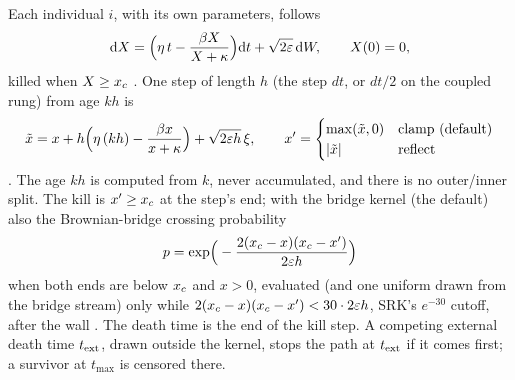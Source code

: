 Each individual $i$, with its own parameters, follows
\begin{equation}\label{eq:lgv-sde}
  \mathrm{d} X=\Big(\eta\,t-\frac{\beta X}{X+\kappa}\Big)\mathrm{d} t+\sqrt{2\varepsilon}\,\mathrm{d} W,\qquad X(0)=0,
\end{equation}
killed when $X\ge x_c$ . One step of length $h$ (the step $dt$, or $dt/2$ on the
coupled rung) from age $kh$ is
\begin{equation}\label{eq:lgv-step}
  \tilde x=x+h\Big(\eta\,(kh)-\frac{\beta x}{x+\kappa}\Big)+\sqrt{2\varepsilon h}\,\xi,\qquad
  x'=\begin{cases}\max(\tilde x,0)&\text{clamp (default)}\\ |\tilde x|&\text{reflect}\end{cases}
\end{equation}
. The age $kh$ is computed from $k$, never accumulated, and there is no outer/inner
split. The kill is $x'\ge x_c$ at the step's end; with the bridge kernel (the default) also the Brownian-bridge crossing
probability
\begin{equation}
  p=\exp\!\Big(-\frac{2(x_c-x)(x_c-x')}{2\varepsilon h}\Big)
\end{equation}
when both ends are below $x_c$ and $x>0$, evaluated (and one uniform drawn from the bridge stream) only while
$2(x_c-x)(x_c-x')<30\cdot2\varepsilon h$, SRK's $e^{-30}$ cutoff, after the wall . The death
time is the end of the kill step. A competing external death time $t_{\rm ext}$, drawn outside the kernel, stops the
path at $t_{\rm ext}$ if it comes first; a survivor at $t_{\max}$ is censored there.

